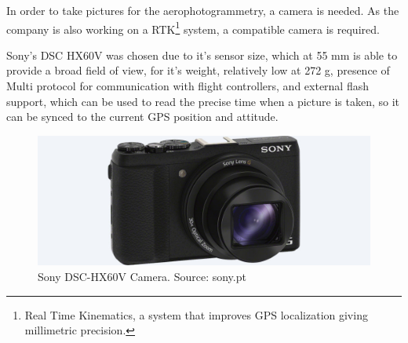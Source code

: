 In order to take pictures for the aerophotogrammetry, a camera is needed. As the company is also working on a RTK\footnote{Real Time Kinematics, a system that improves GPS localization giving millimetric precision.} system, a compatible camera is required.

Sony's DSC HX60V was chosen due to it's sensor size, which at 55 mm is able to provide a broad field of view, for it's weight, relatively low at 272 g, presence of Multi protocol for communication with flight controllers, and external flash support, which can be used to read the precise time when a picture is taken, so it can be synced to the current GPS position and attitude.

\begin{figure}[H]
\centering
  \includegraphics[width=0.8\linewidth]{figs/camera.jpg}
  \caption{Sony DSC-HX60V Camera. Source: sony.pt}
  \label{fig:camera}
\end{figure}


